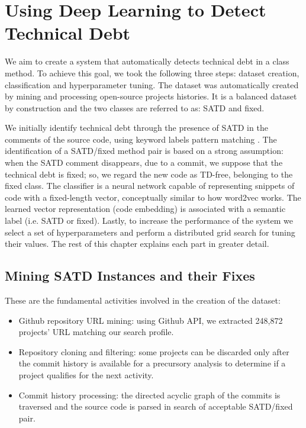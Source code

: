 

\chapter{Using Deep Learning to Detect Technical Debt}

We aim to create a system that automatically detects technical debt in a class method. To achieve this goal, we took the following three steps: dataset creation, classification and hyperparameter tuning.
The dataset was automatically created by mining and processing open-source projects histories. It is a balanced dataset by construction and the two classes are referred to as: SATD and fixed.

We initially identify technical debt through the presence of SATD in the comments of the source code, using keyword labels pattern matching \cite{potdar2014exploratory} \cite{rantala2020prevalence}.
The identification of a SATD/fixed method pair is based on a strong assumption: when the SATD comment disappears, due to a commit, we suppose that the technical debt is fixed; so, we regard the new code as TD-free, belonging to the fixed class.
The classifier is a neural network capable of representing snippets of code with a fixed-length vector, conceptually similar to how word2vec works. The learned vector representation (code embedding) is associated with a semantic label (i.e. SATD or fixed).
Lastly, to increase the performance of the system we select a set of hyperparameters and perform a distributed grid search for tuning their values. The rest of this chapter explains each part in greater detail.

\section{Mining SATD Instances and their Fixes}

These are the fundamental activities involved in the creation of the dataset:
\begin{itemize}
    \item Github repository URL mining: using Github API, we extracted 248,872 projects' URL matching our search profile.
    \item Repository cloning and filtering: some projects can be discarded only after the commit history is available for a precursory analysis to determine if a project qualifies for the next activity.
    \item Commit history processing: the directed acyclic graph of the commits is traversed and the source code is parsed in search of acceptable SATD/fixed pair.
\end{itemize}

